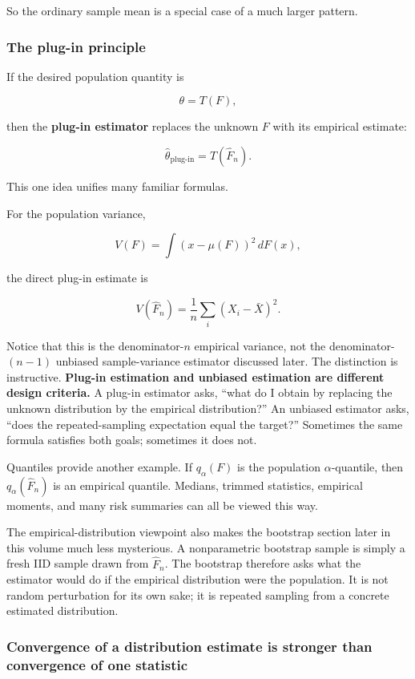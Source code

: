 So the ordinary sample mean is a special case of a much larger pattern.

\subsubsection{The plug-in principle}\label{02-foundations-ii-ch030-the-plug-in-principle}

If the desired population quantity is

\[
\theta=T(F),
\]

then the \textbf{plug-in estimator} replaces the unknown \(F\) with its empirical estimate:

\[
\boxed{
\widehat\theta_{\mathrm{plug\text{-}in}}
=
T(\widehat F_n)
}.
\]

This one idea unifies many familiar formulas.

For the population variance,

\[
V(F)=
\int (x-\mu(F))^2\,dF(x),
\]

the direct plug-in estimate is

\[
V(\widehat F_n)
=
\frac1n\sum_i(X_i-\bar X)^2.
\]

Notice that this is the denominator-\(n\) empirical variance, not the denominator-\((n-1)\) unbiased sample-variance estimator discussed later. The distinction is instructive. \textbf{Plug-in estimation and unbiased estimation are different design criteria.} A plug-in estimator asks, ``what do I obtain by replacing the unknown distribution by the empirical distribution?'' An unbiased estimator asks, ``does the repeated-sampling expectation equal the target?'' Sometimes the same formula satisfies both goals; sometimes it does not.

Quantiles provide another example. If \(q_\alpha(F)\) is the population \(\alpha\)-quantile, then \(q_\alpha(\widehat F_n)\) is an empirical quantile. Medians, trimmed statistics, empirical moments, and many risk summaries can all be viewed this way.

The empirical-distribution viewpoint also makes the bootstrap section later in this volume much less mysterious. A nonparametric bootstrap sample is simply a fresh IID sample drawn from \(\widehat F_n\). The bootstrap therefore asks what the estimator would do if the empirical distribution were the population. It is not random perturbation for its own sake; it is repeated sampling from a concrete estimated distribution.

\subsubsection{Convergence of a distribution estimate is stronger than convergence of one statistic}\label{02-foundations-ii-ch030-convergence-of-a-distribution-estimate-is-stronger-than-convergence-of-one-statistic}


